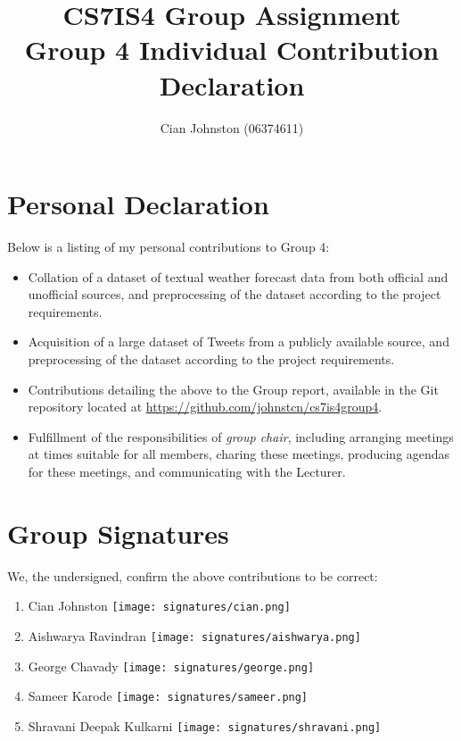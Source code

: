 \documentclass[a4paper,10pt]{article}
\begin{document}
\title{
    CS7IS4 Group Assignment \\
    \large Group 4 Individual Contribution Declaration
}
\author{
    Cian Johnston (06374611)
}

\maketitle

\section{Personal Declaration}

Below is a listing of my personal contributions to Group 4:

\begin{itemize}
    \item{
        Collation of a dataset of textual weather forecast data from both official and unofficial sources, and preprocessing of the dataset according to the project requirements.
    }
    \item{
        Acquisition of a large dataset of Tweets from a publicly available source, and preprocessing of the dataset according to the project requirements.
    }
    \item{
        Contributions detailing the above to the Group report, available in the Git repository located at \url{https://github.com/johnstcn/cs7is4group4}.
    }
    \item{
        Fulfillment of the responsibilities of \textit{group chair}, including arranging meetings at times suitable for all members, charing these meetings, producing agendas for these meetings, and communicating with the Lecturer. 
    }
\end{itemize}

\section{Group Signatures}

We, the undersigned, confirm the above contributions to be correct:

\begin{enumerate}
    \item{
        Cian Johnston \texttt{[image: signatures/cian.png]}
    }
    \item{
        Aishwarya Ravindran \texttt{[image: signatures/aishwarya.png]}
    }
    \item{
        George Chavady \texttt{[image: signatures/george.png]}
    }
    \item{
        Sameer Karode \texttt{[image: signatures/sameer.png]}
    }
    \item{
        Shravani Deepak Kulkarni \texttt{[image: signatures/shravani.png]}
    }

\end{enumerate}
\end{document}
